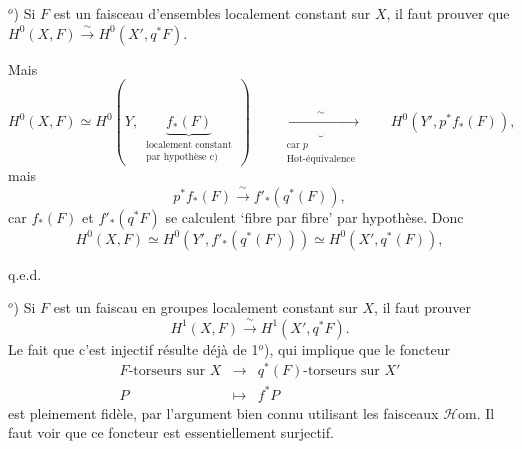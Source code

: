 \documentclass[11pt]{article}
\newcommand{\msp}[1]{\marginpar{\footnotesize [#1]}}
\begin{document}

$^o$) Si $F$ est un faisceau d'ensembles localement constant sur $X$, il faut prouver que $H^0(X,F) \xrightarrow{\sim} H^0(X', q^*F)$.

\msp{page 128}

\noindent Mais
\[
H^0(X,F) \simeq H^0(Y,\ \underbrace{f_*(F)}_{\substack{\text{localement constant}\\ \text{par hypothèse c)}}}\ )
\qquad
\underbrace{\xrightarrow{\qquad\sim\qquad}}_{\substack{\text{car } p\\ \text{Hot-équivalence}}}
\qquad
H^0(Y', p^* f_*(F)),
\]
mais
\[
p^* f_*(F) \xrightarrow{\ \sim\ } f'_*(q^*(F)),
\]
car $f_*(F)$ et $f'_*(q^*F)$ se calculent `fibre par fibre' par hypothèse. Donc
\[
H^0(X,F) \simeq H^0(Y', f'_*(q^*(F))) \simeq H^0(X', q^*(F)),
\]

\hfill q.e.d.

$^o$) Si $F$ est un faiscau en groupes localement constant sur $X$, il faut prouver %
\[
H^1(X,F) \xrightarrow{\ \sim\ } H^1(X', q^*F).
\]
Le fait que c'est injectif résulte déjà de 1$^o$), qui implique que le foncteur
\[
\begin{array}{rcl}
F\text{-torseurs sur } X & \longrightarrow & q^*(F)\text{-torseurs sur } X' \\
P & \longmapsto & f^*P %
\end{array}
\]
est pleinement fidèle, par l'argument bien connu utilisant les faisceaux $\mathcal{H}$om. Il faut voir que ce foncteur est essentiellement surjectif.

\msp{page 129}
\end{document}
